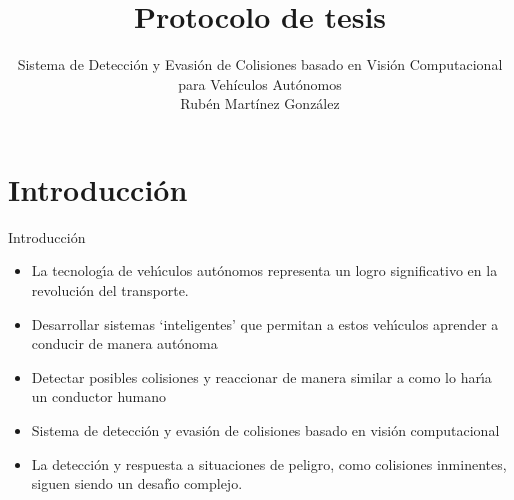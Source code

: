 \documentclass[8pt]{beamer}
\author[]
{Sistema de Detección y Evasión de Colisiones basado en Visión Computacional para Vehículos Autónomos\\
\vspace{2em}
Rubén Martínez González}
\title[Protocolo de tesis]{Protocolo de tesis}
\institute[FMAT, UADY]{Facultad de Matemáticas, UADY}
\date{}
\begin{document}
    \begin{frame}
        \titlepage
    \end{frame}



    \section{Introducción}
    \begin{frame}{Introducción}
        \begin{itemize}
            \item La tecnologı́a de vehı́culos autónomos representa un logro significativo en la revolución del transporte.
            \item Desarrollar sistemas ‘inteligentes’ que permitan a estos vehı́culos aprender a conducir de manera autónoma
            \item Detectar posibles colisiones y reaccionar de manera similar a como lo harı́a un conductor humano
            \item Sistema de detección y evasión de colisiones basado en visión computacional
            \item La detección y respuesta a situaciones de peligro, como colisiones inminentes, siguen siendo un desafı́o complejo.
        \end{itemize}
    \end{frame}
\end{document}
